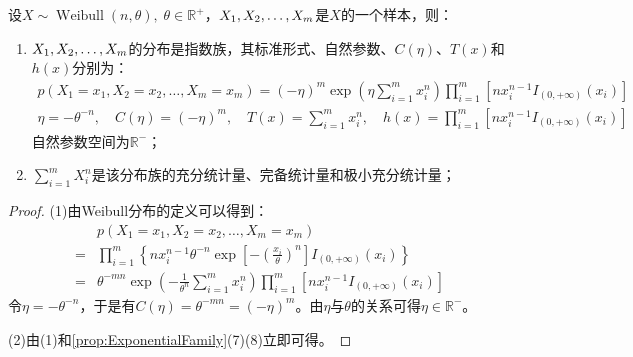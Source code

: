 \begin{theorem}
	设$X\sim\operatorname{Weibull}(n,\theta),\;\theta\in\mathbb{R}^{+}$，$X_1, X_2, \dots, X_{m}$是$X$的一个样本，则：
	\begin{enumerate}
		\item $X_1, X_2, \dots, X_{m}$的分布是指数族，其标准形式、自然参数、$C(\eta)$、$T(x)$和$h(x)$分别为：
		\begin{gather*}
			p(X_1=x_1,X_2=x_2,\dots,X_m=x_m)=(-\eta)^{m}\exp\left(\eta\sum_{i=1}^{m}x_i^n\right)\prod_{i=1}^{m}\left[nx_i^{n-1}I_{(0,+\infty)}(x_i)\right] \\
			\eta=-\theta^{-n},\quad C(\eta)=(-\eta)^{m},\quad
			T(x)=\sum_{i=1}^{m}x_i^n,\quad h(x)=\prod_{i=1}^{m}\left[nx_i^{n-1}I_{(0,+\infty)}(x_i)\right]
		\end{gather*}
		自然参数空间为$\mathbb{R}^{-}$；
		\item $\sum\limits_{i=1}^{m}X_i^n$是该分布族的充分统计量、完备统计量和极小充分统计量；
	\end{enumerate}
\end{theorem}
\begin{proof}
	(1)由Weibull分布的定义可以得到：
	\begin{align*}
		&p(X_1=x_1,X_2=x_2,\dots,X_m=x_m) \\
		=&\prod_{i=1}^{m}\left\{nx_i^{n-1}\theta^{-n}\exp\left[-\left(\frac{x_i}{\theta}\right)^n\right]I_{(0,+\infty)}(x_i)\right\} \\
		=&\theta^{-mn}\exp\left(-\frac{1}{\theta^n}\sum_{i=1}^{m}x_i^n\right)\prod_{i=1}^{m}\left[nx_i^{n-1}I_{(0,+\infty)}(x_i)\right]
	\end{align*}
	令$\eta=-\theta^{-n}$，于是有$C(\eta)=\theta^{-mn}=(-\eta)^{m}$。由$\eta$与$\theta$的关系可得$\eta\in\mathbb{R}^{-}$。\par
	(2)由(1)和\cref{prop:ExponentialFamily}(7)(8)立即可得。
\end{proof}

